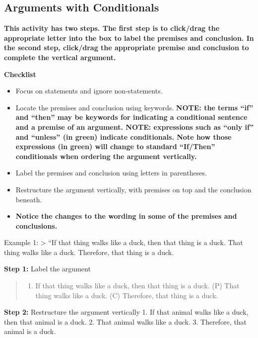 \documentclass[
]{book}
\providecommand{\tightlist}{%
  \setlength{\itemsep}{0pt}\setlength{\parskip}{0pt}}
\begin{document}
\begin{reflect}
\hypertarget{arguments-with-conditionals}{%
\subsection*{Arguments with Conditionals}\label{arguments-with-conditionals}}

\textbf{This activity has two steps. The first step is to click/drag the appropriate letter into the box to label the premises and conclusion. In the second step, click/drag the appropriate premise and conclusion to complete the vertical argument.}

\textbf{Checklist}

\begin{itemize}
\tightlist
\item
  Focus on statements and ignore non-statements.
\item
  Locate the premises and conclusion using keywords. \textbf{NOTE: the terms ``if'' and ``then'' may be keywords for indicating a conditional sentence and a premise of an argument. NOTE: expressions such as ``only if'' and ``unless'' (in green) indicate conditionals. Note how those expressions (in green) will change to standard ``If/Then'' conditionals when ordering the argument vertically.}
\item
  Label the premises and conclusion using letters in parentheses.
\item
  Restructure the argument vertically, with premises on top and the conclusion beneath.
\item
  \textbf{Notice the changes to the wording in some of the premises and conclusions.}
\end{itemize}

Example 1:
\textgreater{} ``If that thing walks like a duck, then that thing is a duck. That thing walks like a duck. Therefore, that thing is a duck.

\textbf{Step 1:} Label the argument

\begin{quote}
\begin{enumerate}
\def\labelenumi{(\Alph{enumi})}
\setcounter{enumi}{15}
\tightlist
\item
  If that thing walks like a duck, then that thing is a duck. (P) That thing walks like a duck. (C) Therefore, that thing is a duck.
\end{enumerate}
\end{quote}

\textbf{Step 2:} Restructure the argument vertically
1. If that animal walks like a duck, then that animal is a duck.
2. That animal walks like a duck.
3. Therefore, that animal is a duck.


\end{reflect}
\end{document}
